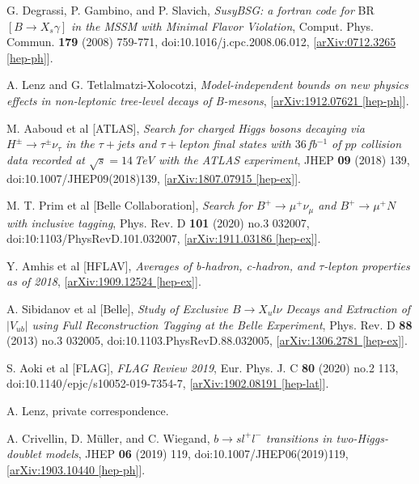 \documentclass[a4paper,12pt]{article}
\begin{document}
\begin{thebibliography}{99}
G. Degrassi, P. Gambino, and P. Slavich, \emph{SusyBSG: a fortran code for} BR$[B\to X_s\gamma]$ \emph{in the MSSM with Minimal Flavor Violation}, Comput. Phys. Commun. \textbf{179} (2008) 759-771, doi:10.1016/j.cpc.2008.06.012, [\href{https://arxiv.org/abs/0712.3265}{arXiv:0712.3265 [hep-ph]}].

A. Lenz and G. Tetlalmatzi-Xolocotzi, \emph{Model-independent bounds on new physics effects in non-leptonic tree-level decays of B-mesons}, [\href{https://arxiv.org/abs/1912.07621}{arXiv:1912.07621 [hep-ph]}].

M. Aaboud et al [ATLAS], \emph{Search for charged Higgs bosons decaying via $H^{\pm}\to\tau^\pm\nu_\tau$ in the $\tau+$jets and $\tau+$lepton final states with $36\,$fb$^{-1}$ of $pp$ collision data recorded at $\sqrt{s}=14\,$TeV with the ATLAS experiment}, JHEP \textbf{09} (2018) 139, doi:10.1007/JHEP09(2018)139, [\href{https://arxiv.org/abs/1807.07915}{arXiv:1807.07915 [hep-ex]}].

M. T. Prim et al [Belle Collaboration], \emph{Search for $B^+\to\mu^+\nu_\mu$ and $B^+\to\mu^+N$ with inclusive tagging}, Phys. Rev. D \textbf{101} (2020) no.3 032007, doi:10:1103/PhysRevD.101.032007, [\href{https://arxiv.org/abs/1911.03186}{arXiv:1911.03186 [hep-ex]}].

Y. Amhis et al [HFLAV], \emph{Averages of b-hadron, c-hadron, and $\tau$-lepton properties as of 2018}, [\href{https://arxiv.org/abs/1909.12524}{arXiv:1909.12524 [hep-ex]}].

A. Sibidanov et al [Belle], \emph{Study of Exclusive $B\to X_ul\nu$ Decays and Extraction of $|V_{ub}|$ using Full Reconstruction Tagging at the Belle Experiment}, Phys. Rev. D \textbf{88} (2013) no.3 032005, doi:10.1103.PhysRevD.88.032005, [\href{https://arxiv.org/abs/1306.2781}{arXiv:1306.2781 [hep-ex]}].

S. Aoki et al [FLAG], \emph{FLAG Review 2019}, Eur. Phys. J. C \textbf{80} (2020) no.2 113, doi:10.1140/epjc/s10052-019-7354-7, [\href{https://arxiv.org/abs/1902.08191}{arXiv:1902.08191 [hep-lat]}].

A. Lenz, private correspondence.

A. Crivellin, D. M\"{u}ller, and C. Wiegand, \emph{$b\to sl^+l^-$ transitions in two-Higgs-doublet models}, JHEP \textbf{06} (2019) 119, doi:10.1007/JHEP06(2019)119, [\href{https://arxiv.org/abs/1903.10440}{arXiv:1903.10440 [hep-ph]}].


\end{thebibliography}
\end{document}

